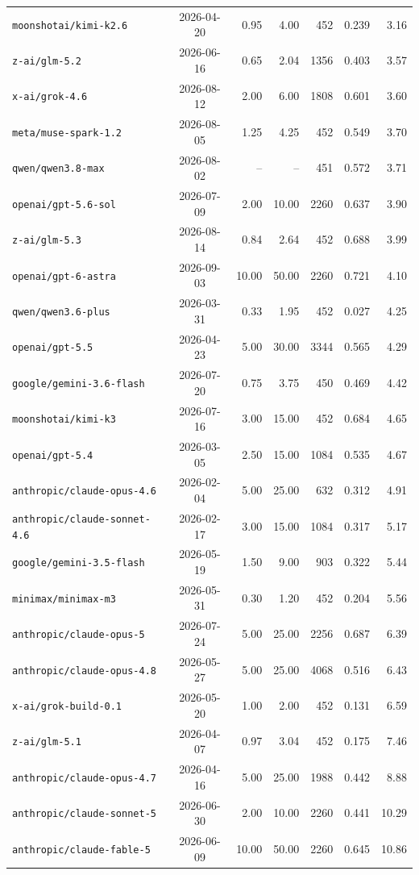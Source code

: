 \begin{longtable}{lcrrrrr}
\texttt{moonshotai/kimi-k2.6} & 2026-04-20 & 0.95 & 4.00 & 452 & 0.239 & 3.16\\
\texttt{z-ai/glm-5.2} & 2026-06-16 & 0.65 & 2.04 & 1356 & 0.403 & 3.57\\
\texttt{x-ai/grok-4.6} & 2026-08-12 & 2.00 & 6.00 & 1808 & 0.601 & 3.60\\
\texttt{meta/muse-spark-1.2} & 2026-08-05 & 1.25 & 4.25 & 452 & 0.549 & 3.70\\
\texttt{qwen/qwen3.8-max} & 2026-08-02 & -- & -- & 451 & 0.572 & 3.71\\
\texttt{openai/gpt-5.6-sol} & 2026-07-09 & 2.00 & 10.00 & 2260 & 0.637 & 3.90\\
\texttt{z-ai/glm-5.3} & 2026-08-14 & 0.84 & 2.64 & 452 & 0.688 & 3.99\\
\texttt{openai/gpt-6-astra} & 2026-09-03 & 10.00 & 50.00 & 2260 & 0.721 & 4.10\\
\texttt{qwen/qwen3.6-plus} & 2026-03-31 & 0.33 & 1.95 & 452 & 0.027 & 4.25\\
\texttt{openai/gpt-5.5} & 2026-04-23 & 5.00 & 30.00 & 3344 & 0.565 & 4.29\\
\texttt{google/gemini-3.6-flash} & 2026-07-20 & 0.75 & 3.75 & 450 & 0.469 & 4.42\\
\texttt{moonshotai/kimi-k3} & 2026-07-16 & 3.00 & 15.00 & 452 & 0.684 & 4.65\\
\texttt{openai/gpt-5.4} & 2026-03-05 & 2.50 & 15.00 & 1084 & 0.535 & 4.67\\
\texttt{anthropic/claude-opus-4.6} & 2026-02-04 & 5.00 & 25.00 & 632 & 0.312 & 4.91\\
\texttt{anthropic/claude-sonnet-4.6} & 2026-02-17 & 3.00 & 15.00 & 1084 & 0.317 & 5.17\\
\texttt{google/gemini-3.5-flash} & 2026-05-19 & 1.50 & 9.00 & 903 & 0.322 & 5.44\\
\texttt{minimax/minimax-m3} & 2026-05-31 & 0.30 & 1.20 & 452 & 0.204 & 5.56\\
\texttt{anthropic/claude-opus-5} & 2026-07-24 & 5.00 & 25.00 & 2256 & 0.687 & 6.39\\
\texttt{anthropic/claude-opus-4.8} & 2026-05-27 & 5.00 & 25.00 & 4068 & 0.516 & 6.43\\
\texttt{x-ai/grok-build-0.1} & 2026-05-20 & 1.00 & 2.00 & 452 & 0.131 & 6.59\\
\texttt{z-ai/glm-5.1} & 2026-04-07 & 0.97 & 3.04 & 452 & 0.175 & 7.46\\
\texttt{anthropic/claude-opus-4.7} & 2026-04-16 & 5.00 & 25.00 & 1988 & 0.442 & 8.88\\
\texttt{anthropic/claude-sonnet-5} & 2026-06-30 & 2.00 & 10.00 & 2260 & 0.441 & 10.29\\
\texttt{anthropic/claude-fable-5} & 2026-06-09 & 10.00 & 50.00 & 2260 & 0.645 & 10.86\\
\bottomrule\end{longtable}
